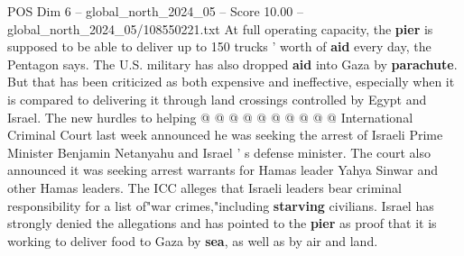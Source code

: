 \begin{textsample}{POS Dim 6 – global\_north\_2024\_05 – Score 10.00 – global\_north\_2024\_05/108550221.txt}
At full operating capacity, the \textbf{pier} is supposed to be able to deliver up to 150 trucks ' worth of \textbf{aid} every day, the Pentagon says.
The U.S. military has also dropped \textbf{aid} into Gaza by \textbf{parachute}.
But that has been criticized as both expensive and ineffective, especially when it is compared to delivering it through land crossings controlled by Egypt and Israel.
The new hurdles to helping @ @ @ @ @ @ @ @ @ @ International Criminal Court last week announced he was seeking the arrest of Israeli Prime Minister Benjamin Netanyahu and Israel ' s defense minister.
The court also announced it was seeking arrest warrants for Hamas leader Yahya Sinwar and other Hamas leaders.
The ICC alleges that Israeli leaders bear criminal responsibility for a list of"war crimes,"including \textbf{starving} civilians.
Israel has strongly denied the allegations and has pointed to the \textbf{pier} as proof that it is working to deliver food to Gaza by \textbf{sea}, as well as by air and land.

\end{textsample}
